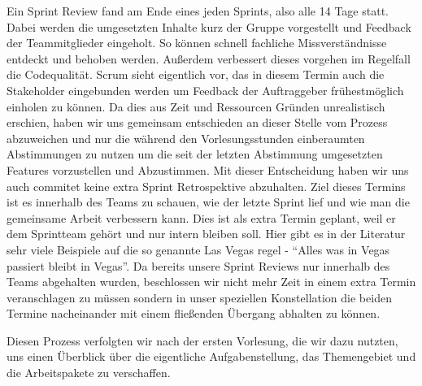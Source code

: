  Ein Sprint Review fand am Ende eines jeden Sprints, also alle 14 Tage statt. Dabei werden die umgesetzten Inhalte kurz der Gruppe vorgestellt und Feedback der Teammitglieder eingeholt. So können schnell fachliche Missverständnisse entdeckt und behoben werden. Außerdem verbessert dieses vorgehen im Regelfall die Codequalität. Scrum sieht eigentlich vor, das in diesem Termin auch die Stakeholder eingebunden werden um Feedback der Auftraggeber frühestmöglich einholen zu können. Da dies aus Zeit und Ressourcen Gründen unrealistisch erschien, haben wir uns gemeinsam entschieden an dieser Stelle vom Prozess abzuweichen und nur die während den Vorlesungsstunden einberaumten Abstimmungen zu nutzen um die seit der letzten Abstimmung umgesetzten Features vorzustellen und Abzustimmen. Mit dieser Entscheidung haben wir uns auch commitet keine extra Sprint Retrospektive abzuhalten. Ziel dieses Termins ist es innerhalb des Teams zu schauen, wie der letzte Sprint lief und wie man die gemeinsame Arbeit verbessern kann. Dies ist als extra Termin geplant, weil er dem Sprintteam gehört und nur intern bleiben soll. Hier gibt es in der Literatur sehr viele Beispiele auf die so genannte Las Vegas regel - \enquote{Alles was in Vegas passiert bleibt in Vegas}. Da bereits unsere Sprint Reviews nur innerhalb des Teams abgehalten wurden, beschlossen wir nicht mehr Zeit in einem extra Termin veranschlagen zu müssen sondern in unser speziellen Konstellation die beiden Termine nacheinander mit einem fließenden Übergang abhalten zu können. 
 
Diesen Prozess verfolgten wir nach der ersten Vorlesung, die wir dazu nutzten, uns einen Überblick über die eigentliche Aufgabenstellung, das Themengebiet und die Arbeitspakete zu verschaffen. 